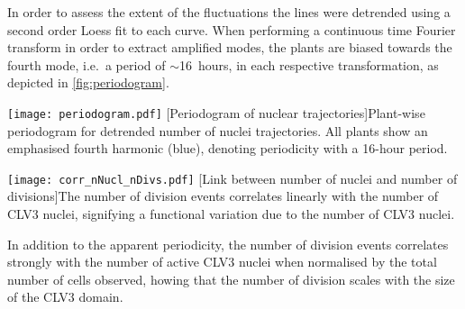 
In order to assess the extent of the fluctuations the lines were detrended using
a second order Loess fit to each curve. When performing a continuous time
Fourier transform in order to extract amplified modes, the plants are
biased towards the fourth mode, i.e.\ a period of $\sim$16~hours, in each respective transformation, as depicted in
\cref{fig:periodogram}.
\vspace{2em}

\begin{minipage}{\textwidth}
  \begin{minipage}[t]{0.47\textwidth}
    \centering
    \texttt{[image: periodogram.pdf]}
    [Periodogram of nuclear trajectories]{Plant-wise periodogram for detrended number of nuclei
      trajectories. All plants show an emphasised fourth harmonic (blue),
      denoting periodicity with a 16-hour period.}
    \label{fig:periodogram}
  \end{minipage}\hfill
  \begin{minipage}[t]{.47\textwidth}
    \centering
    \texttt{[image: corr\_nNucl\_nDivs.pdf]}
    [Link between number of nuclei and number of divisions]{The number of division events correlates linearly
      with the number of CLV3 nuclei, signifying a functional variation due
      to the number of CLV3 nuclei.
    }
  \end{minipage}
\end{minipage}

\vspace{2em}
In addition to the apparent periodicity, the number of division events
correlates strongly with the number of active CLV3 nuclei when normalised by the
total number of cells observed, howing that the number of division scales with
the size of the CLV3 domain.


